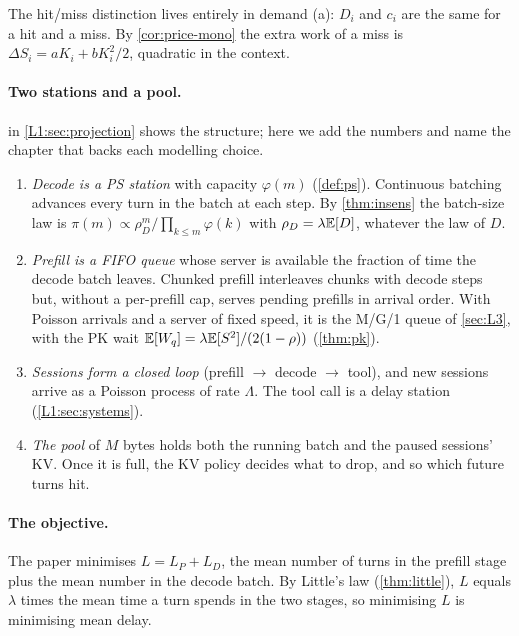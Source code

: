 The hit/miss distinction lives entirely in demand (a): $D_i$ and $c_i$ are
the same for a hit and a miss. By \cref{cor:price-mono} the extra work of a
miss is $\Delta S_i=aK_i+bK_i^2/2$, quadratic in the context.

\paragraph{Two stations and a pool.}  in
\cref{L1:sec:projection} shows the structure; here we add the numbers and
name the chapter that backs each modelling choice.
\begin{enumerate}
\item \emph{Decode is a PS station} with capacity $\varphi(m)$
  (\cref{def:ps}). Continuous batching advances every turn in the batch at
  each step. By \cref{thm:insens} the batch-size law is
  $\pi(m)\propto\rho_D^m/\prod_{k\le m}\varphi(k)$ with $\rho_D=\lambda\mathbb{E}[D]$,
  whatever the law of $D$.
\item \emph{Prefill is a FIFO queue} whose server is available the fraction
  of time the decode batch leaves. Chunked prefill interleaves chunks with
  decode steps but, without a per-prefill cap, serves pending prefills in arrival
  order. With Poisson arrivals and
  a server of fixed speed, it is the M/G/1 queue of \cref{sec:L3}, with the PK wait
  $\mathbb{E}[W_q]=\lambda\mathbb{E}[S^2]/(2(1-\rho))$ (\cref{thm:pk}).
\item \emph{Sessions form a closed loop} (prefill $\to$ decode $\to$ tool),
  and new sessions arrive as a Poisson process of rate $\Lambda$. The tool
  call is a delay station (\cref{L1:sec:systems}).
\item \emph{The pool} of $M$ bytes holds both the running batch and the
  paused sessions' KV. Once it is full, the KV policy decides what to
  drop, and so which future turns hit.
\end{enumerate}

\paragraph{The objective.} The paper minimises $L=L_P+L_D$, the mean number
of turns in the prefill stage plus the mean number in the decode batch. By
Little's law (\cref{thm:little}), $L$ equals $\lambda$ times the mean time a
turn spends in the two stages, so minimising $L$ is minimising mean delay.


